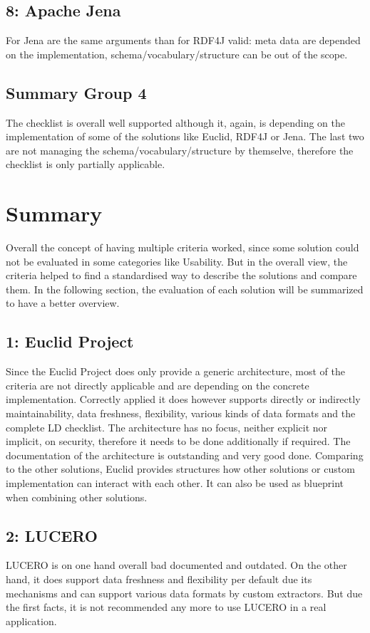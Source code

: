 \subsection*{8: Apache Jena}
For Jena are the same arguments than for RDF4J valid: meta data are depended on the implementation, schema/vocabulary/structure can be out of the scope.

\subsection{Summary Group 4}
The checklist is overall well supported although it, again, is depending on the implementation of some of the solutions like Euclid, RDF4J or Jena. The last two are not managing the schema/vocabulary/structure by themselve, therefore the checklist is only partially applicable.

\section{Summary}\label{comp_summary}

Overall the concept of having multiple criteria worked, since some solution could not be evaluated in some categories like Usability. But in the overall view, the criteria helped to find a standardised way to describe the solutions and compare them. In the following section, the evaluation of each solution will be summarized to have a better overview.

\subsection*{1: Euclid Project}
Since the Euclid Project does only provide a generic architecture, most of the criteria are not directly applicable and are depending on the concrete implementation. Correctly applied it does however supports directly or indirectly maintainability, data freshness, flexibility, various kinds of data formats and the complete LD checklist. The architecture has no focus, neither explicit nor implicit, on security, therefore it needs to be done additionally if required. The documentation of the architecture is outstanding and very good done.
Comparing to the other solutions, Euclid provides structures how other solutions or custom implementation can interact with each other. It can also be used as blueprint when combining other solutions.

\subsection*{2: LUCERO}
LUCERO is on one hand overall bad documented and outdated. On the other hand, it does support data freshness and flexibility per default due its mechanisms and can support various data formats by custom extractors. But due the first facts, it is not recommended any more to use LUCERO in a real application.

